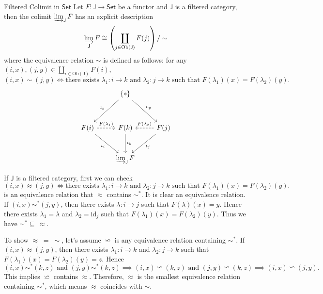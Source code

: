\begin{example}{Filtered Colimit in $\mathsf{Set}$}{}
    Let $F:\mathsf{J}\to \mathsf{Set}$ be a functor and $\mathsf{J}$ is a filtered category, then 
    the colimit $\varinjlim_\mathsf{J} F$ has an explicit description
    \begin{align*}
        \varinjlim_\mathsf{J} F\cong\left(\coprod_{j\in \mathrm{Ob}(\mathsf{J})}F(j)\right)/\sim  
    \end{align*}
    where the equivalence relation $\sim$ is defined as follows: for any $(i,x),(j,y)\in \coprod\limits_{i\in \mathrm{Ob}(\mathsf{J})}F(i)$,
    \[
        (i,x)\sim (j,y)\iff \text{there exists }\lambda_1:i\to k\text{ and }\lambda_2:j\to k\text{ such that }F(\lambda_1)(x)=F(\lambda_2)(y).
    \]
    \[
        \begin{tikzcd}[ampersand replacement=\&]
            \& \{*\} \arrow[ld, "c_x"'] \arrow[rd, "c_y"] \&                                                               \\[+1.5em]
F(i) \arrow[rd, "\iota_i"'] \arrow[r, "F(\lambda_1)", dashed] \& F(k) \arrow[d, "\iota_k"]                  \& F(j) \arrow[ld, "\iota_j"] \arrow[l, "F(\lambda_2)"', dashed] \\[+1em]
            \& \varinjlim_{\mathsf{J}}F                   \&                                                              
\end{tikzcd}
\]
\end{example}
\begin{prf} 
    If $\mathsf{J}$ is a filtered category, first we can check 
    \[
        (i,x)\approx (j,y)\iff \text{there exists }\lambda_1:i\to k\text{ and }\lambda_2:j\to k\text{ such that }F(\lambda_1)(x)=F(\lambda_2)(y).
    \]
    is an equivalence relation that $\approx$ contains $\sim^*$. It is clear an equivalence relation. If $(i,x)\sim^* (j,y)$, then there exists $\lambda:i\to j$ such that $F(\lambda)(x)=y$. Hence there exists $\lambda_1=\lambda$ and $\lambda_2=\mathrm{id}_j$ such that $F(\lambda_1)(x)=F(\lambda_2)(y)$. Thus we have $\sim^*\subseteq\, \approx$.
    
    To show $\approx\;=\;\sim$, let's assume $\backsimeq$ is any equivalence relation containing $\sim^*$. If $(i,x)\approx(j,y)$, then there exists $\lambda_1:i\to k$ and $\lambda_2:j\to k$ such that $F(\lambda_1)(x)=F(\lambda_2)(y)=z$. Hence 
    \[
        (i,x)\sim^* (k,z)\text{ and }(j,y)\sim^* (k,z)\implies(i,x)\backsimeq (k,z)\text{ and }(j,y)\backsimeq (k,z)\implies (i,x)\backsimeq (j,y).
    \]
    This implies $\backsimeq$ contains $\approx$. Therefore, $\approx$ is the smallest equivalence relation containing $\sim^*$, which means $\approx$ coincides with $\sim$.
\end{prf}
